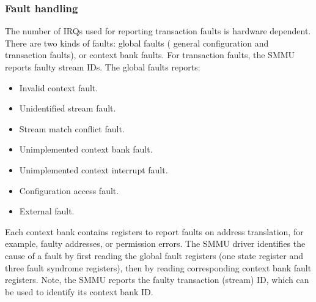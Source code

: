 \subsubsection{Fault handling}
\label{sec:smmuv2-fault-handling}
The number of IRQs used for reporting transaction faults is hardware dependent.
There are two kinds of faults: global faults ( general configuration and
transaction faults), or context bank faults. For transaction faults, the SMMU
reports faulty stream IDs. The global faults reports:
\begin{itemize}
    \item Invalid context fault.
    \item Unidentified stream fault.
    \item Stream match conflict fault.
    \item Unimplemented context bank fault.
    \item Unimplemented context interrupt fault.
    \item Configuration access fault.
    \item External fault.
\end{itemize}
Each context bank contains registers to report faults on address translation, for
example, faulty addresses, or permission errors. The SMMU driver identifies the
cause of a fault by first reading the global fault registers (one state register
and three fault syndrome registers), then by reading corresponding context bank
fault registers. Note, the SMMU reports the faulty transaction (stream) ID,
which can be used to identify its context bank ID.

